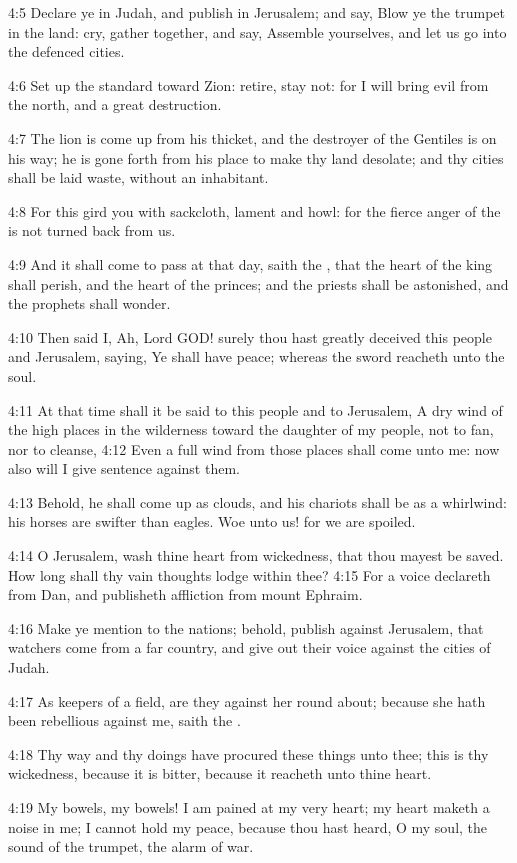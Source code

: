 4:5 Declare ye in Judah, and publish in Jerusalem; and say, Blow ye the trumpet in the land: cry, gather together, and say, Assemble yourselves, and let us go into the defenced cities.

4:6 Set up the standard toward Zion: retire, stay not: for I will bring evil from the north, and a great destruction.

4:7 The lion is come up from his thicket, and the destroyer of the Gentiles is on his way; he is gone forth from his place to make thy land desolate; and thy cities shall be laid waste, without an inhabitant.

4:8 For this gird you with sackcloth, lament and howl: for the fierce anger of the \LORD is not turned back from us.

4:9 And it shall come to pass at that day, saith the \LORD, that the heart of the king shall perish, and the heart of the princes; and the priests shall be astonished, and the prophets shall wonder.

4:10 Then said I, Ah, Lord GOD! surely thou hast greatly deceived this people and Jerusalem, saying, Ye shall have peace; whereas the sword reacheth unto the soul.

4:11 At that time shall it be said to this people and to Jerusalem, A dry wind of the high places in the wilderness toward the daughter of my people, not to fan, nor to cleanse, 4:12 Even a full wind from those places shall come unto me: now also will I give sentence against them.

4:13 Behold, he shall come up as clouds, and his chariots shall be as a whirlwind: his horses are swifter than eagles. Woe unto us! for we are spoiled.

4:14 O Jerusalem, wash thine heart from wickedness, that thou mayest be saved. How long shall thy vain thoughts lodge within thee?  4:15 For a voice declareth from Dan, and publisheth affliction from mount Ephraim.

4:16 Make ye mention to the nations; behold, publish against Jerusalem, that watchers come from a far country, and give out their voice against the cities of Judah.

4:17 As keepers of a field, are they against her round about; because she hath been rebellious against me, saith the \LORD.

4:18 Thy way and thy doings have procured these things unto thee; this is thy wickedness, because it is bitter, because it reacheth unto thine heart.

4:19 My bowels, my bowels! I am pained at my very heart; my heart maketh a noise in me; I cannot hold my peace, because thou hast heard, O my soul, the sound of the trumpet, the alarm of war.

